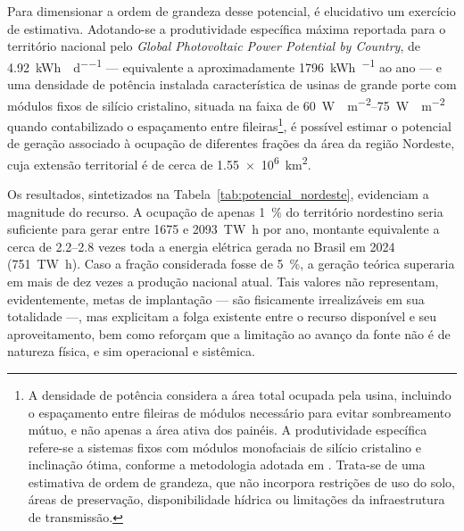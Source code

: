 Para dimensionar a ordem de grandeza desse potencial, é elucidativo um exercício
de estimativa. Adotando-se a produtividade específica máxima reportada para o
território nacional pelo \textit{Global Photovoltaic Power Potential by Country},
de \SI{4,92}{\kWh\per\kWp\per\day} --- equivalente a aproximadamente
\SI{1796}{\kWh\per\kWp} ao ano \cite{WorldBank2020} --- e uma densidade de
potência instalada característica de usinas de grande porte com módulos fixos de
silício cristalino, situada na faixa de \SIrange{60}{75}{\watt\peak\per\square\metre}
quando contabilizado o espaçamento entre fileiras\footnote{A densidade de
potência considera a área total ocupada pela usina, incluindo o espaçamento
entre fileiras de módulos necessário para evitar sombreamento mútuo, e não
apenas a área ativa dos painéis. A produtividade específica refere-se a sistemas
fixos com módulos monofaciais de silício cristalino e inclinação ótima, conforme
a metodologia adotada em . Trata-se de uma estimativa
de ordem de grandeza, que não incorpora restrições de uso do solo, áreas de
preservação, disponibilidade hídrica ou limitações da infraestrutura de
transmissão.}, é possível estimar o potencial de geração associado à ocupação de
diferentes frações da área da região Nordeste, cuja extensão territorial é de
cerca de \SI{1,55e6}{\square\kilo\metre}.

Os resultados, sintetizados na Tabela~\ref{tab:potencial_nordeste}, evidenciam a
magnitude do recurso. A ocupação de apenas \SI{1}{\percent} do território
nordestino seria suficiente para gerar entre \num{1675} e \SI{2093}{\tera\watt\hour}
por ano, montante equivalente a cerca de \numrange{2,2}{2,8} vezes toda a energia
elétrica gerada no Brasil em 2024 (\SI{751}{\tera\watt\hour}). Caso a fração
considerada fosse de \SI{5}{\percent}, a geração teórica superaria em mais de dez
vezes a produção nacional atual. Tais valores não representam, evidentemente,
metas de implantação --- são fisicamente irrealizáveis em sua totalidade ---, mas
explicitam a folga existente entre o recurso disponível e seu aproveitamento, bem
como reforçam que a limitação ao avanço da fonte não é de natureza física, e sim
operacional e sistêmica.

